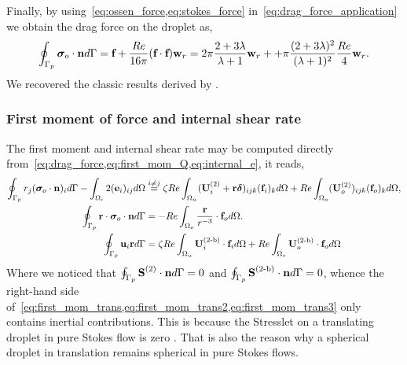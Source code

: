 Finally, by using~\ref{eq:ossen_force,eq:stokes_force} in~\ref{eq:drag_force_application} we obtain the drag force on the droplet as, 
\begin{equation}
    \intS[p]{\bm\sigma_{o}\cdot \textbf{n}}
    =
        \textbf{f}+ \frac{Re }{16\pi}(\textbf{f}\cdot \textbf{f})\textbf{w}_r
    =
    2\pi \frac{2+3\lambda}{\lambda+1}\textbf{w}_r+ 
    + \pi \frac{(2+3\lambda)^2}{(\lambda+1)^2}
        \frac{Re }{4} \textbf{w}_r.
    \label{eq:drag_force_application_last}
\end{equation}
We recovered the classic results derived by \citet{proudman1957expansions}. 

\subsubsection{First moment of force and internal shear rate}

The first moment and internal shear rate may be computed directly from~\ref{eq:drag_force,eq:first_mom_Q,eq:internal_e}, it reads, 
\begin{align}
    \label{eq:first_mom_trans}
        \intS[p]{r_j(\bm\sigma_{o}\cdot \textbf{n})_i}
        - \intO[i]{2(\textbf{e}_i)_{ij}}
        &\overset{i\neq j}{=}
        \zeta Re \intO{(\textbf{U}_{i}^{(2)} + \textbf{r}\bm\delta)_{ijk} (\textbf{f}_{i})_k} 
        + Re\intO[o]{(\textbf{U}_{o}^{(2)})_{ijk}(\textbf{f}_{o})_k},
    \\
    \label{eq:first_mom_trans2}
    \intS[p]{\textbf{r} \cdot  \bm\sigma_{o}\cdot \textbf{n}}
    &=
    - Re\intO[o]{\frac{\textbf{r}}{r^{-3}}\cdot \textbf{f}_{o}}. \\
    \label{eq:first_mom_trans3}
    \intS[p]{\textbf{u}_{i} \textbf{r}}
    &=
    \zeta Re \intO{\textbf{U}_{i}^\text{(2-b)}\cdot \textbf{f}_{i}} 
    + Re\intO[o]{\textbf{U}_{o}^\text{(2-b)}\cdot \textbf{f}_{o}}
\end{align}
Where we noticed that $\intS[p]{\textbf{S}^{(2)}\cdot \textbf{n}} = 0$ and $\intS[p]{\textbf{S}^\text{(2-b)}\cdot \textbf{n}} = 0$, whence the right-hand side of~\ref{eq:first_mom_trans,eq:first_mom_trans2,eq:first_mom_trans3} only contains inertial contributions. 
This is because the Stresslet on a translating droplet in pure Stokes flow is zero \citep{kim2013microhydrodynamics}.
That is also the reason why a spherical droplet in translation remains spherical in pure Stokes flows. 

